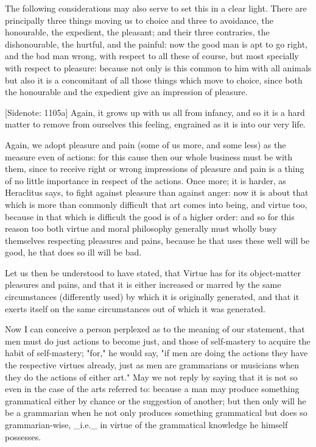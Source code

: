 The following considerations may also serve to set this in a clear
light. There are principally three things moving us to choice and three
to avoidance, the honourable, the expedient, the pleasant; and their
three contraries, the dishonourable, the hurtful, and the painful: now
the good man is apt to go right, and the bad man wrong, with respect
to all these of course, but most specially with respect to pleasure:
because not only is this common to him with all animals but also it is
a concomitant of all those things which move to choice, since both the
honourable and the expedient give an impression of pleasure.

[Sidenote: 1105a] Again, it grows up with us all from infancy, and so it
is a hard matter to remove from ourselves this feeling, engrained as it
is into our very life.

Again, we adopt pleasure and pain (some of us more, and some less) as
the measure even of actions: for this cause then our whole business must
be with them, since to receive right or wrong impressions of pleasure
and pain is a thing of no little importance in respect of the actions.
Once more; it is harder, as Heraclitus says, to fight against pleasure
than against anger: now it is about that which is more than commonly
difficult that art comes into being, and virtue too, because in that
which is difficult the good is of a higher order: and so for this
reason too both virtue and moral philosophy generally must wholly busy
themselves respecting pleasures and pains, because he that uses these
well will be good, he that does so ill will be bad.

Let us then be understood to have stated, that Virtue has for its
object-matter pleasures and pains, and that it is either increased or
marred by the same circumstances (differently used) by which it
is originally generated, and that it exerts itself on the same
circumstances out of which it was generated.

Now I can conceive a person perplexed as to the meaning of our
statement, that men must do just actions to become just, and those of
self-mastery to acquire the habit of self-mastery; "for," he would say,
"if men are doing the actions they have the respective virtues already,
just as men are grammarians or musicians when they do the actions of
either art." May we not reply by saying that it is not so even in the
case of the arts referred to: because a man may produce something
grammatical either by chance or the suggestion of another; but then only
will he be a grammarian when he not only produces something grammatical
but does so grammarian-wise, _i.e._ in virtue of the grammatical
knowledge he himself possesses.

